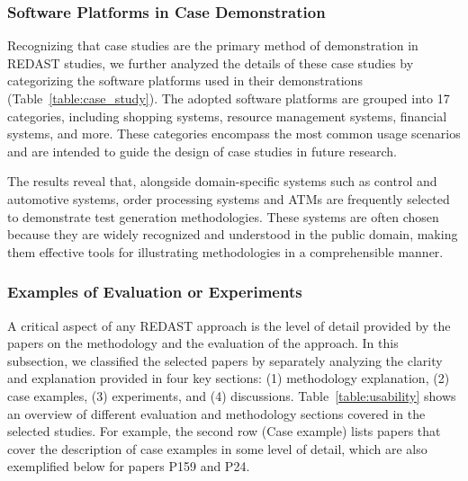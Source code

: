 \subsubsection{Software Platforms in Case Demonstration}

Recognizing that case studies are the primary method of demonstration in REDAST studies, we further analyzed the details of these case studies by categorizing the software platforms used in their demonstrations (Table~\ref{table:case_study}). The adopted software platforms are grouped into 17 categories, including shopping systems, resource management systems, financial systems, and more. These categories encompass the most common usage scenarios and are intended to guide the design of case studies in future research.

The results reveal that, alongside domain-specific systems such as control and automotive systems, order processing systems and ATMs are frequently selected to demonstrate test generation methodologies. These systems are often chosen because they are widely recognized and understood in the public domain, making them effective tools for illustrating methodologies in a comprehensible manner.

\subsubsection{Examples of Evaluation or Experiments}

A critical aspect of any REDAST approach is the level of detail provided by the papers on the methodology and the evaluation of the approach. In this subsection, we classified the selected papers by separately analyzing the clarity and explanation provided in four key sections: (1) methodology explanation, (2) case examples, (3) experiments, and (4) discussions. Table~\ref{table:usability} shows an overview of different evaluation and methodology sections covered in the selected studies. For example, the second row (Case example) lists papers that cover the description of case examples in some level of detail, which are also exemplified below for papers P159 and P24. 

